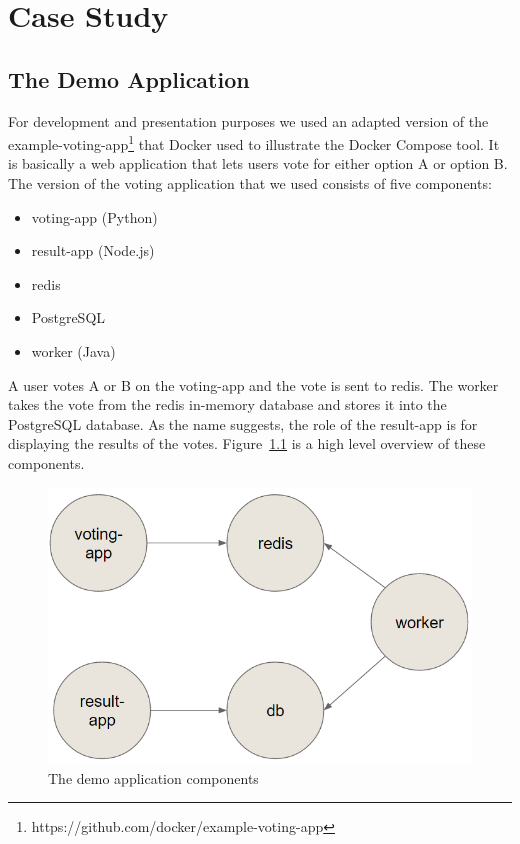 \documentclass{seal_thesis}
\begin{document}
\chapter{Case Study}\label{ch:casestudy}

\section{The Demo Application}
For development and presentation purposes we used an adapted version of the example-voting-app\footnote{https://github.com/docker/example-voting-app} that Docker used to illustrate the Docker Compose tool.
It is basically a web application that lets users vote for either option A or option B.
The version of the voting application that we used consists of five components:
\begin{itemize}
	\item voting-app (Python)
	\item result-app (Node.js)
	\item redis
	\item PostgreSQL
	\item worker (Java)
\end{itemize}
A user votes A or B on the voting-app and the vote is sent to redis.
The worker takes the vote from the redis in-memory database and stores it into the PostgreSQL database.
As the name suggests, the role of the result-app is for displaying the results of the votes.
Figure~\ref{fig:demoapp} is a high level overview of these components.

\begin{figure}[!ht]
\centering
	\includegraphics[scale=0.5]{demo-app.png}
	\caption{The demo application components}
	\label{fig:demoapp}
\end{figure}
\end{document}
